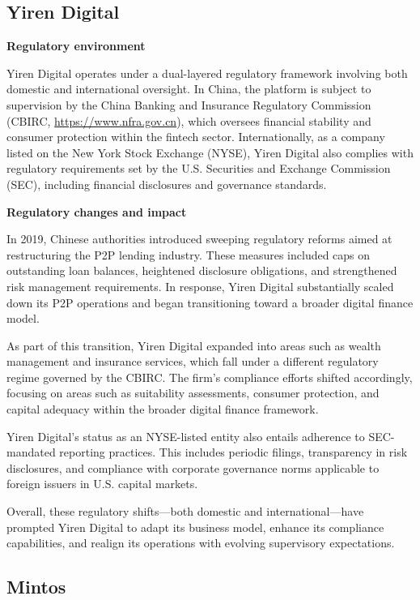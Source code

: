 \documentclass[pdflatex,sn-apa]{sn-jnl}%
\theoremstyle{thmstyleone}%
\theoremstyle{thmstyletwo}%
\theoremstyle{thmstylethree}%
\begin{document}
\subsection{Yiren Digital}

\textbf{Regulatory environment}

Yiren Digital operates under a dual-layered regulatory framework involving both domestic and international oversight. In China, the platform is subject to supervision by the China Banking and Insurance Regulatory Commission (CBIRC, \url{https://www.nfra.gov.cn}), which oversees financial stability and consumer protection within the fintech sector. Internationally, as a company listed on the New York Stock Exchange (NYSE), Yiren Digital also complies with regulatory requirements set by the U.S. Securities and Exchange Commission (SEC), including financial disclosures and governance standards.

\textbf{Regulatory changes and impact}

In 2019, Chinese authorities introduced sweeping regulatory reforms aimed at restructuring the P2P lending industry. These measures included caps on outstanding loan balances, heightened disclosure obligations, and strengthened risk management requirements. In response, Yiren Digital substantially scaled down its P2P operations and began transitioning toward a broader digital finance model.

As part of this transition, Yiren Digital expanded into areas such as wealth management and insurance services, which fall under a different regulatory regime governed by the CBIRC. The firm’s compliance efforts shifted accordingly, focusing on areas such as suitability assessments, consumer protection, and capital adequacy within the broader digital finance framework.

Yiren Digital’s status as an NYSE-listed entity also entails adherence to SEC-mandated reporting practices. This includes periodic filings, transparency in risk disclosures, and compliance with corporate governance norms applicable to foreign issuers in U.S. capital markets.

Overall, these regulatory shifts—both domestic and international—have prompted Yiren Digital to adapt its business model, enhance its compliance capabilities, and realign its operations with evolving supervisory expectations.

\subsection{Mintos}
\end{document}
